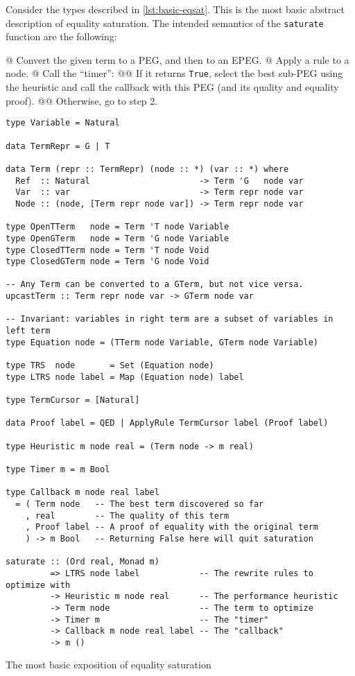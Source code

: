 \documentclass[11pt]{report}
\begin{document}
Consider the types described in \autoref{lst:basic-eqsat}. This is the most
basic abstract description of equality saturation. The intended semantics of the
\texttt{saturate} function are the following:

\begin{easylist}[enumerate]
@ Convert the given term to a PEG, and then to an EPEG.
@ Apply a rule to a node.
@ Call the ``timer'':
@@ {%
  If it returns \texttt{True}, select the best sub-PEG using the heuristic and
  call the callback with this PEG (and its quality and equality proof).
}
@@ {%
  Otherwise, go to step 2.
}
\end{easylist}

\begin{listing}[ht]
\begin{verbatim}
type Variable = Natural

data TermRepr = G | T

data Term (repr :: TermRepr) (node :: *) (var :: *) where
  Ref  :: Natural                      -> Term 'G   node var
  Var  :: var                          -> Term repr node var
  Node :: (node, [Term repr node var]) -> Term repr node var

type OpenTTerm   node = Term 'T node Variable
type OpenGTerm   node = Term 'G node Variable
type ClosedTTerm node = Term 'T node Void
type ClosedGTerm node = Term 'G node Void

-- Any Term can be converted to a GTerm, but not vice versa.
upcastTerm :: Term repr node var -> GTerm node var

-- Invariant: variables in right term are a subset of variables in left term
type Equation node = (TTerm node Variable, GTerm node Variable)

type TRS  node       = Set (Equation node)
type LTRS node label = Map (Equation node) label

type TermCursor = [Natural]

data Proof label = QED | ApplyRule TermCursor label (Proof label)

type Heuristic m node real = (Term node -> m real)

type Timer m = m Bool

type Callback m node real label
  = ( Term node   -- The best term discovered so far
    , real        -- The quality of this term
    , Proof label -- A proof of equality with the original term
    ) -> m Bool   -- Returning False here will quit saturation

saturate :: (Ord real, Monad m)
         => LTRS node label            -- The rewrite rules to optimize with
         -> Heuristic m node real      -- The performance heuristic
         -> Term node                  -- The term to optimize
         -> Timer m                    -- The "timer"
         -> Callback m node real label -- The "callback"
         -> m ()
\end{verbatim}
\caption{The most basic exposition of equality saturation}
\label{lst:basic-eqsat}
\end{listing}
\end{document}
